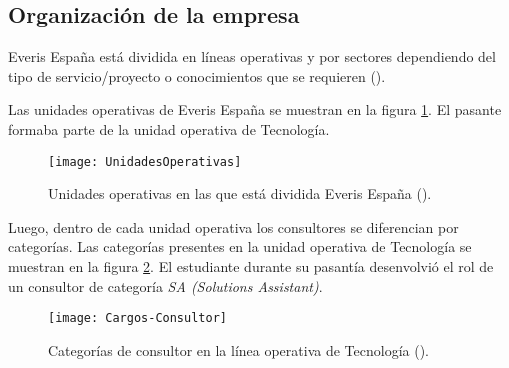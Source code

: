 \subsection{Organización de la empresa}

Everis España está dividida en líneas operativas y por sectores
dependiendo del tipo de servicio/proyecto o conocimientos que se requieren (\cite{MANUAL}).

Las unidades operativas de Everis España se muestran en la figura \ref{unidades}.
El pasante formaba parte de la unidad operativa de Tecnología.

\begin{figure}[h!]
\centering
\texttt{[image: UnidadesOperativas]}
\caption[Unidades Operativas de Everis]{Unidades operativas en las que
        está dividida Everis España (\cite{MANUAL}).}
\label{unidades}
\end{figure}


Luego, dentro de cada unidad operativa los consultores se diferencian por categorías.
Las categorías presentes en la unidad operativa de Tecnología se muestran en la
figura \ref{categorias}.
El estudiante durante su pasantía desenvolvió el rol de un consultor de categoría
\emph{SA (Solutions Assistant)}.

\begin{figure}[h!]
\centering
\texttt{[image: Cargos-Consultor]}
\caption[Categorías en Tecnología]{Categorías de consultor en la línea operativa
  de Tecnología (\cite{MANUAL}).}
\label{categorias}
\end{figure}










